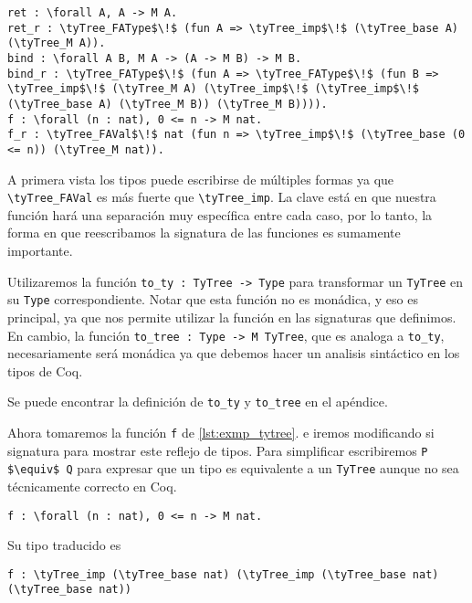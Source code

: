\begin{lstlisting}[frame=tb,caption={Ejemplos de \lstinline{TyTree}},label=lst:exmp_tytree]
ret : \forall A, A -> M A.
ret_r : \tyTree_FAType$\!$ (fun A => \tyTree_imp$\!$ (\tyTree_base A) (\tyTree_M A)).
bind : \forall A B, M A -> (A -> M B) -> M B.
bind_r : \tyTree_FAType$\!$ (fun A => \tyTree_FAType$\!$ (fun B => \tyTree_imp$\!$ (\tyTree_M A) (\tyTree_imp$\!$ (\tyTree_imp$\!$ (\tyTree_base A) (\tyTree_M B)) (\tyTree_M B)))).
f : \forall (n : nat), 0 <= n -> M nat.
f_r : \tyTree_FAVal$\!$ nat (fun n => \tyTree_imp$\!$ (\tyTree_base (0 <= n)) (\tyTree_M nat)).
\end{lstlisting}

A primera vista los tipos puede escribirse de múltiples formas ya que \lstinline{\tyTree_FAVal} es más fuerte que \lstinline{\tyTree_imp}. La clave está en que nuestra función \lift hará una separación muy específica entre cada caso, por lo tanto, la forma en que reescribamos la signatura de las funciones es sumamente importante.

Utilizaremos la función \lstinline{to_ty : TyTree -> Type} para transformar un \lstinline{TyTree} en su \lstinline{Type} correspondiente. Notar que esta función no es monádica, y eso es principal, ya que nos permite utilizar la función en las signaturas que definimos. En cambio, la función \lstinline{to_tree : Type -> M TyTree}, que es analoga a \lstinline{to_ty}, necesariamente será monádica ya que debemos hacer un analisis sintáctico en los tipos de Coq.

Se puede encontrar la definición de \lstinline{to_ty} y \lstinline{to_tree} en el apéndice.

\iffalse
Ahora tomaremos la función \lstinline{f} de \ref{lst:exmp_tytree}. e iremos modificando si signatura para mostrar este reflejo de tipos.
Para simplificar escribiremos \lstinline{P $\equiv$ Q} para expresar que un tipo es equivalente a un \lstinline{TyTree} aunque no sea técnicamente correcto en Coq.

\begin{lstlisting}
f : \forall (n : nat), 0 <= n -> M nat.
\end{lstlisting}

Su tipo traducido es

\begin{lstlisting}
f : \tyTree_imp (\tyTree_base nat) (\tyTree_imp (\tyTree_base nat) (\tyTree_base nat))
\end{lstlisting}

